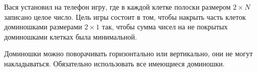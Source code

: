 Вася установил на телефон игру, где в каждой клетке полоски размером $2 \times N$ записано целое число. Цель игры состоит в том, чтобы накрыть часть клеток доминошками размерами $2 \times 1$ так, чтобы сумма чисел на не покрытых доминошками клетках была минимальной. 

Доминошки можно поворачивать горизонтально или вертикально, они не могут накладываться. Обязательно использовать все имеющиеся доминошки.
